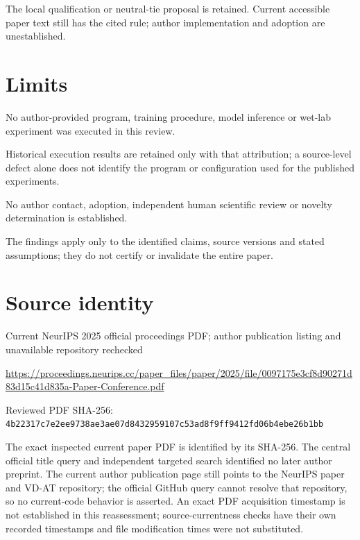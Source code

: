 \documentclass[11pt]{article}
\begin{document}
The local qualification or neutral-tie proposal is retained. Current accessible paper text still has the cited rule; author implementation and adoption are unestablished.

\section*{Limits}

No author-provided program, training procedure, model inference or wet-lab experiment was executed in this review.\par

Historical execution results are retained only with that attribution; a source-level defect alone does not identify the program or configuration used for the published experiments.\par

No author contact, adoption, independent human scientific review or novelty determination is established.\par

The findings apply only to the identified claims, source versions and stated assumptions; they do not certify or invalidate the entire paper.\par

\section*{Source identity}

Current NeurIPS 2025 official proceedings PDF; author publication listing and unavailable repository rechecked

\url{https://proceedings.neurips.cc/paper_files/paper/2025/file/0097175e3cf8d90271d83d15c41d835a-Paper-Conference.pdf}

Reviewed PDF SHA-256: \nolinkurl{4b22317c7e2ee9738ae3ae07d8432959107c53ad8f9ff9412fd06b4ebe26b1bb}

The exact inspected current paper PDF is identified by its SHA-256. The central official title query and independent targeted search identified no later author preprint. The current author publication page still points to the NeurIPS paper and VD-AT repository; the official GitHub query cannot resolve that repository, so no current-code behavior is asserted. An exact PDF acquisition timestamp is not established in this reassessment; source-currentness checks have their own recorded timestamps and file modification times were not substituted.
\end{document}
